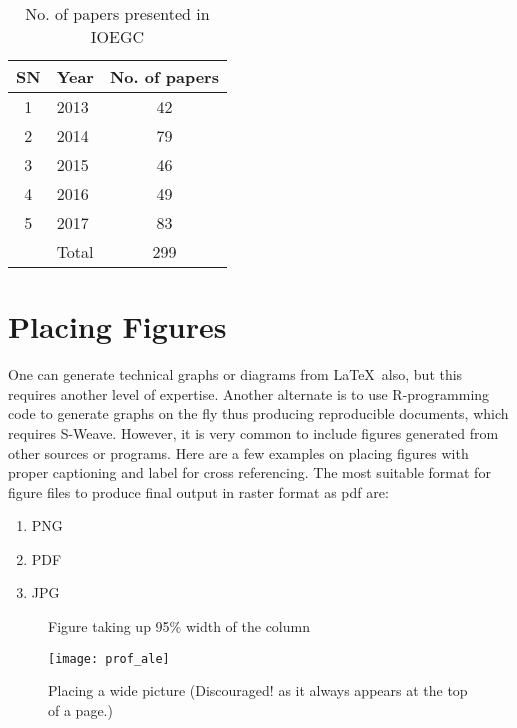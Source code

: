 \documentclass[fleqn, 11pt, twoside]{IOEGC2019}
\begin{document}
\begin{table}[H]
	\caption{No. of papers presented in IOEGC}
	\label{tbl:capacity}
	\centering
	\begin{tabular}{|c|l|c|} %
		\hline
		SN & Year & No. of papers \\
		\hline
		1 & 2013 & 42	\\
		2 & 2014 & 79	\\
		3 & 2015 & 46	\\
		4 & 2016 & 49	\\
		5 & 2017 & 83 	\\
		\hline
		 & Total & 299 	\\
		\hline
	\end{tabular}
\end{table}


\section{Placing Figures} \label{sec:figures}
One can generate technical graphs or diagrams from \LaTeX\ also, but this 
requires another level of expertise. Another alternate is to use R-programming 
code to generate graphs on the fly thus producing reproducible documents, 
which requires S-Weave. However, it is very common to include figures generated 
from other sources or programs. Here are a few examples on placing figures with 
proper captioning and label for cross referencing. The most suitable format for 
figure files to produce final output in raster format as pdf are:

\begin{enumerate}[noitemsep]
	\item PNG
	\item PDF
	\item JPG
\end{enumerate}

\begin{figure}[H]\centering
	\caption{Figure taking up 95\% width of the column}
	\label{fig:graph-1}
\end{figure}

\begin{figure*}[hbt]\centering
	\texttt{[image: prof\_ale]}
	\caption{Placing a wide picture (Discouraged! as it always appears at the 
			 top of a page.)}
	\label{fig:ale-sir}
\end{figure*}
\end{document}
